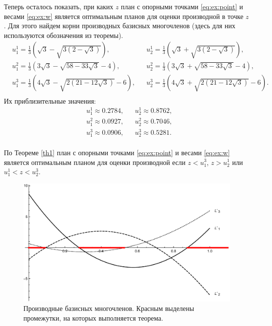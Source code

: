 \documentclass[specialist,
               substylefile = spbu.rtx,
               subf,href,colorlinks=true, 12pt]{disser}
\theoremstyle{definition}
\begin{document}
	Теперь осталось показать, при каких $z$ план с опорными точками \eqref{eq:ex:point} и весами \eqref{eq:ex:w} является оптимальным планов для оценки производной в точке $z$. Для этого найдем корни производных базисных многочленов (здесь для них используются обозначения из теоремы).
	\begin{align*}
		&u_1^1 = \frac{1}{3} \left(\sqrt{3}-\sqrt{3 \left(2-\sqrt{3}\right)}\right), &&u_2^1 = \frac{1}{3} \left(\sqrt{3}+\sqrt{3 \left(2-\sqrt{3}\right)}\right),\\
		&u_1^2 = \frac{1}{3} \left(3 \sqrt{3}-\sqrt{58-33 \sqrt{3}}-4\right), &&u_2^2 = \frac{1}{3} \left(3 \sqrt{3}+\sqrt{58-33 \sqrt{3}}-4\right), \\
		&u_1^3 = \frac{1}{3} \left(4 \sqrt{3}-\sqrt{2 \left(21-12 \sqrt{3}\right)}-6\right), &&u_2^3 = \frac{1}{3} \left(4 \sqrt{3}+\sqrt{2 \left(21-12 \sqrt{3}\right)}-6\right).\\
	\end{align*}
	Их приблизительные значения:
	\begin{align*}
		&u_1^1 \approx 0.2784, &&u_2^1  \approx 0.8762,\\
		&u_1^2 \approx 0.0927, &&u_2^2 \approx 0.7046, \\
		&u_1^3 \approx 0.0906, &&u_2^3 \approx 0.5281.\\
	\end{align*}
	
	По Теореме \ref{th1} план с опорными точками \eqref{eq:ex:point} и весами \eqref{eq:ex:w} является оптимальным планом для оценки производной если $z < u_1^3$, $z > u_2^1$ или $u_1^1 < z < u_2^3$.
	
	\begin{figure}
		\includegraphics[width=\textwidth]{fig/dl_color.pdf}
		\caption{Производные базисных многочленов. Красным выделены промежутки, на которых выполняется теорема.}
	\end{figure}
	
\end{document}
